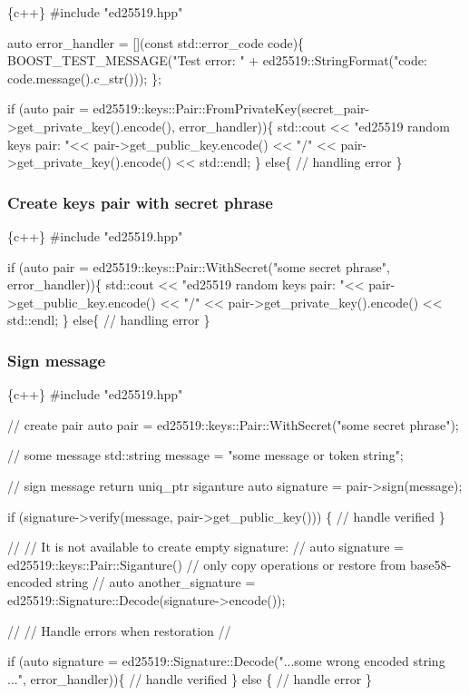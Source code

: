 \begin{DoxyCode}
\{c++\}
#include "ed25519.hpp"

auto error\_handler = [](const std::error\_code code)\{
    BOOST\_TEST\_MESSAGE("Test error: " + ed25519::StringFormat("code: %
       code.message().c\_str()));
\};

if (auto pair = ed25519::keys::Pair::FromPrivateKey(secret\_pair->get\_private\_key().encode(),
       error\_handler))\{
    std::cout << "ed25519 random keys pair: "<< pair->get\_public\_key.encode() << "/" << 
       pair->get\_private\_key().encode() << std::endl;
\}
else\{
    // handling error
\}
\end{DoxyCode}


\subsubsection*{Create keys pair with secret phrase}


\begin{DoxyCode}
\{c++\}
#include "ed25519.hpp"


if (auto pair = ed25519::keys::Pair::WithSecret("some secret phrase", error\_handler))\{
    std::cout << "ed25519 random keys pair: "<< pair->get\_public\_key.encode() << "/" << 
       pair->get\_private\_key().encode() << std::endl;
\}
else\{
    // handling error
\}
\end{DoxyCode}


\subsubsection*{Sign message}


\begin{DoxyCode}
\{c++\}
#include "ed25519.hpp"

// create pair
auto pair           = ed25519::keys::Pair::WithSecret("some secret phrase");

// some message 
std::string message = "some message or token string";

// sign message return uniq\_ptr siganture
auto signature      = pair->sign(message);

if (signature->verify(message, pair->get\_public\_key())) \{
   // handle verified
\}

//
// It is not available to create empty signature:
// auto signature = ed25519::keys::Pair::Siganture()
// only copy operations or restore from base58-encoded string 
//
auto another\_signature = ed25519::Signature::Decode(signature->encode());

//
// Handle errors when restoration
//

if (auto signature = ed25519::Signature::Decode("...some wrong encoded string ...", error\_handler))\{
    // handle verified
\}
else \{
    // handle error
\}
\end{DoxyCode}
 